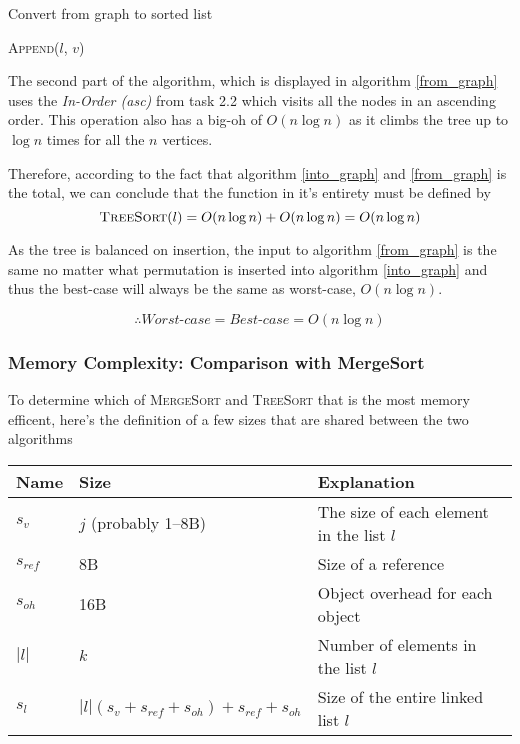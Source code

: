 \documentclass[a4paper,11pt]{article}
\begin{document}
\begin{algorithm}
\caption{Convert from graph to sorted list}
\label{from_graph}

\begin{algorithmic}
\State \textsc{Append}($l$, $v$)
\EndFor
\end{algorithmic}
\end{algorithm}

The second part of the algorithm, which is displayed in algorithm \ref{from_graph} uses the \textit{In-Order (asc)} from task 2.2 which visits all the nodes in an ascending order. This operation also has a big-oh of $O(n\log n)$ as it climbs the tree up to $\log n$ times for all the $n$ vertices.

Therefore, according to the fact that algorithm \ref{into_graph} and \ref{from_graph} is the total, we can conclude that the function in it's entirety must be defined by $$\textsc{TreeSort}(l) = O(n\log n) + O(n\log n) = O(n\log n)$$

As the tree is balanced on insertion, the input to algorithm \ref{from_graph} is the same no matter what permutation is inserted into algorithm \ref{into_graph} and thus the best-case will always be the same as worst-case, $O(n\log n)$.

$$\therefore \textit{Worst-case} = \textit{Best-case} = O(n\log n)$$

\subsubsection{Memory Complexity: Comparison with MergeSort}
To determine which of \textsc{MergeSort} and \textsc{TreeSort} that is the most memory efficent, here's the definition of a few sizes that are shared between the two algorithms

\begin{tabular}{|l|l|l|}
\hline
\textbf{Name} & \textbf{Size} & \textbf{Explanation}\\
\hline
$s_v$ & $j$ (probably 1--8B) & The size of each element in the list $l$\\
\hline
$s_{ref}$ & 8B & Size of a reference\\
\hline
$s_{oh}$ & 16B & Object overhead for each object \\
\hline
$|l|$ & $k$ & Number of elements in the list $l$\\
\hline
$s_{l}$ & $|l|(s_v + s_{ref} + s_{oh}) + s_{ref} + s_{oh}$ & Size of the entire linked list $l$\\
\hline
\end{tabular}
\end{document}
